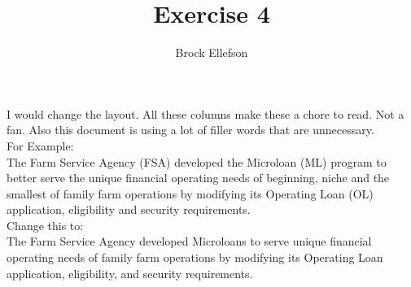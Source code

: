 \documentclass[10pt,a4paper]{article}
\author{Brock Ellefson}
\title{Exercise 4}
\begin{document}
\maketitle
I would change the layout. All these columns make these a chore to read. Not a fan. Also this document is using a lot of filler words that are unnecessary. \\For Example:\\
The Farm Service Agency (FSA) developed the Microloan (ML) program to better serve the unique financial operating needs of beginning, niche and the smallest of family farm operations by modifying its Operating Loan (OL) application, eligibility and security requirements.
\\
Change this to:
\\
The Farm Service Agency developed Microloans to serve unique financial operating needs of family farm operations by modifying its Operating Loan application, eligibility, and security requirements.
\\
\end{document}

